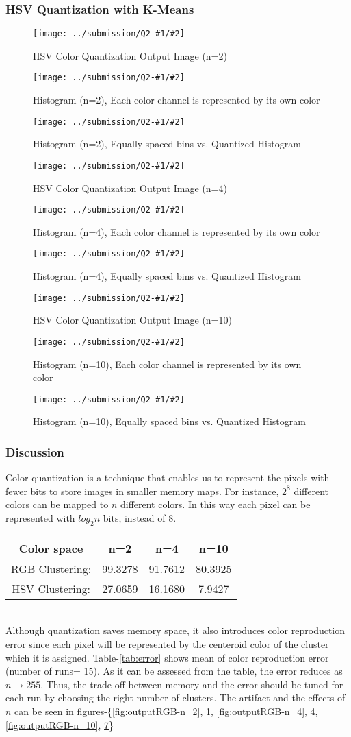 \documentclass{article}
\newcommand{\listFigure}[4]{
\begin{figure}[H]
	\texttt{[image: ../submission/Q2-\#1/\#2]}
	\caption{#3\label{fig:#4}}
\end{figure}		
}
\begin{document}
	\subsubsection{HSV Quantization with K-Means}
	\listFigure{1}{HSV2.jpg}{HSV Color Quantization Output Image
	(n=2)}{outputHSV-n_2}
	\listFigure{1}{histHSV-nCluster2.png}{Histogram	(n=2),
	Each color channel is represented by its own color}{histHSV-n_2}
	\listFigure{1}{histInputvsHSVnCluster2.png}{Histogram (n=2), Equally
	spaced bins vs. Quantized Histogram}{histHSV-nCluster2}
		
	\listFigure{1}{HSV4.jpg}{HSV Color Quantization Output Image
	(n=4)}{outputHSV-n_4}
	\listFigure{1}{histHSV-nCluster4.png}{Histogram	(n=4),
	Each color channel is represented by its own color}{histHSV-n_4}
	\listFigure{1}{histInputvsHSVnCluster4.png}{Histogram (n=4), Equally
	spaced bins vs. Quantized Histogram}{histHSV-nCluster4}
	
	\listFigure{1}{HSV10.jpg}{HSV Color Quantization Output Image
	(n=10)}{outputHSV-n_10}  
	\listFigure{1}{histHSV-nCluster10.png}{Histogram (n=10), Each color
	channel is represented by its own color}{histHSV-n_10}
	\listFigure{1}{histInputvsHSVnCluster10.png}{Histogram (n=10), Equally
	spaced bins vs. Quantized Histogram}{histHSV-nCluster10}
	\subsubsection{Discussion}
	Color quantization is a technique that enables us to represent the pixels
	with fewer bits to store images in smaller memory maps. For instance, $2^8$
	different colors can be mapped to $n$ different colors. In this way each pixel
	can be represented with $log_2{n}$ bits, instead of 8. \\

	\label{tab:error}
	\begin{tabular}{ | c || c | c | c |}
	\hline			 
	Color space 	& n=2 & n=4 & n=10\\ \hline
	RGB Clustering: & 99.3278 & 91.7612 & 80.3925\\
	HSV Clustering: & 27.0659 & 16.1680 & 7.9427\\
	\hline  	
	\end{tabular} \\	
	
	Although quantization saves memory space, it also
	introduces color reproduction error since each pixel will be represented by the
	centeroid color of the cluster which it is assigned. Table-\ref{tab:error}
	shows mean of color reproduction error (number of runs= 15). As it can be
	assessed from the table, the error reduces as $n \rightarrow 255$. Thus, the
	trade-off between memory and the error should be tuned for each run by choosing
	the right number of clusters. The artifact and the effects of $n$ can be seen
	in figures-\{\ref{fig:outputRGB-n_2}, \ref{fig:outputHSV-n_2},
	\ref{fig:outputRGB-n_4}, \ref{fig:outputHSV-n_4}, \ref{fig:outputRGB-n_10},
	\ref{fig:outputHSV-n_10}\} \\
 
\end{document}

